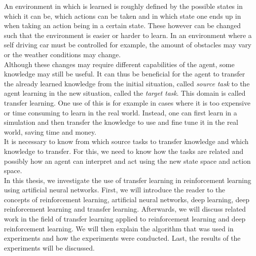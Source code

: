 An environment in which is learned is roughly defined by the possible states in which it can be, which actions can be taken and in which state one ends up in when taking an action being in a certain state.
These however can be changed such that the environment is easier or harder to learn.
In an environment where a self driving car must be controlled for example, the amount of obstacles may vary or the weather conditions may change.\\
Although these changes may require different capabilities of the agent, some knowledge may still be useful.
It can thus be beneficial for the agent to transfer the already learned knowledge from the initial situation, called \textit{source task} to the agent learning in the new situation, called the \textit{target task}.
This domain is called transfer learning. One use of this is for example in cases where it is too expensive or time consuming to learn in the real world. Instead, one can first learn in a simulation and then transfer the knowledge to use and fine tune it in the real world, saving time and money.\\
It is necessary to know from which source tasks to transfer knowledge and which knowledge to transfer.
For this, we need to know how the tasks are related and possibly how an agent can interpret and act using the new state space and action space.\\

In this thesis, we investigate the use of transfer learning in reinforcement learning using artificial neural networks.
First, we will introduce the reader to the concepts of reinforcement learning, artificial neural networks, deep learning, deep reinforcement learning and transfer learning.
Afterwards, we will discuss related work in the field of transfer learning applied to reinforcement learning and deep reinforcement learning.
We will then explain the algorithm that was used in experiments and how the experiments were conducted.
Last, the results of the experiments will be discussed.
